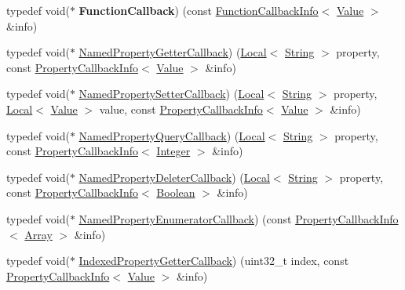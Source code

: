 \begin{DoxyCompactItemize}
\item 
\hypertarget{namespacev8_a9eb0624666bb117aea1fb9c9424dcc1b}{}typedef void($\ast$ {\bfseries Function\+Callback}) (const \hyperlink{classv8_1_1FunctionCallbackInfo}{Function\+Callback\+Info}$<$ \hyperlink{classv8_1_1Value}{Value} $>$ \&info)\label{namespacev8_a9eb0624666bb117aea1fb9c9424dcc1b}

\item 
typedef void($\ast$ \hyperlink{namespacev8_a50cae386a68bf9ff23d02aa1161face4}{Named\+Property\+Getter\+Callback}) (\hyperlink{classv8_1_1Local}{Local}$<$ \hyperlink{classv8_1_1String}{String} $>$ property, const \hyperlink{classv8_1_1PropertyCallbackInfo}{Property\+Callback\+Info}$<$ \hyperlink{classv8_1_1Value}{Value} $>$ \&info)
\item 
typedef void($\ast$ \hyperlink{namespacev8_a9587769513971dc7cb301b740d9e66b6}{Named\+Property\+Setter\+Callback}) (\hyperlink{classv8_1_1Local}{Local}$<$ \hyperlink{classv8_1_1String}{String} $>$ property, \hyperlink{classv8_1_1Local}{Local}$<$ \hyperlink{classv8_1_1Value}{Value} $>$ value, const \hyperlink{classv8_1_1PropertyCallbackInfo}{Property\+Callback\+Info}$<$ \hyperlink{classv8_1_1Value}{Value} $>$ \&info)
\item 
typedef void($\ast$ \hyperlink{namespacev8_ac135beae5f0c8b290255accb438f990e}{Named\+Property\+Query\+Callback}) (\hyperlink{classv8_1_1Local}{Local}$<$ \hyperlink{classv8_1_1String}{String} $>$ property, const \hyperlink{classv8_1_1PropertyCallbackInfo}{Property\+Callback\+Info}$<$ \hyperlink{classv8_1_1Integer}{Integer} $>$ \&info)
\item 
typedef void($\ast$ \hyperlink{namespacev8_aaba861076c5b111912cfa0791d348437}{Named\+Property\+Deleter\+Callback}) (\hyperlink{classv8_1_1Local}{Local}$<$ \hyperlink{classv8_1_1String}{String} $>$ property, const \hyperlink{classv8_1_1PropertyCallbackInfo}{Property\+Callback\+Info}$<$ \hyperlink{classv8_1_1Boolean}{Boolean} $>$ \&info)
\item 
typedef void($\ast$ \hyperlink{namespacev8_a5f6f16818a9cddacadbfe6d90ca3a6b1}{Named\+Property\+Enumerator\+Callback}) (const \hyperlink{classv8_1_1PropertyCallbackInfo}{Property\+Callback\+Info}$<$ \hyperlink{classv8_1_1Array}{Array} $>$ \&info)
\item 
typedef void($\ast$ \hyperlink{namespacev8_a48e7816ba64447bf32a25d194588daaf}{Indexed\+Property\+Getter\+Callback}) (uint32\+\_\+t index, const \hyperlink{classv8_1_1PropertyCallbackInfo}{Property\+Callback\+Info}$<$ \hyperlink{classv8_1_1Value}{Value} $>$ \&info)

\end{DoxyCompactItemize}
